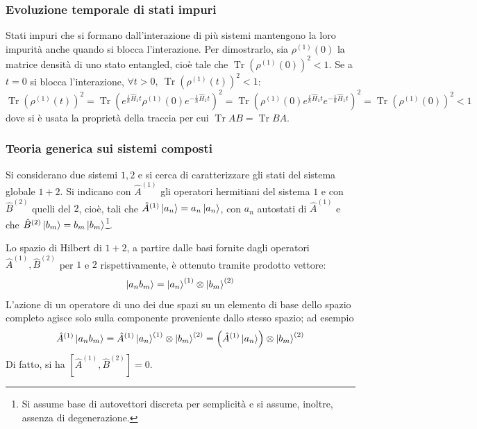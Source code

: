 \documentclass[11pt, a4paper]{scrartcl} %
\numberwithin{equation}{subsection}
\theoremstyle{style2}
\theoremstyle{style1}
\begin{document}
\subsubsection{Evoluzione temporale di stati impuri}

Stati impuri che si formano dall'interazione di pi\`u sistemi mantengono la loro impurit\`a anche quando si blocca l'interazione. 
Per dimostrarlo, sia $\rho ^{(1)} (0)$ la matrice densit\`a di uno stato entangled, cio\`e tale che $\operatorname{Tr} \left(\rho ^{(1)}(0) \right) ^2 < 1 $.
Se a $t=0$ si blocca l'interazione, $\forall t> 0 , \ \operatorname{Tr} \left(\rho ^{(1)} (t)\right) ^2 < 1$:
\[
\operatorname{Tr} \left(\rho ^{(1)} (t)\right) ^2 = \operatorname{Tr} \left(e^{\frac{i}{\hbar }\hat{H}_1 t} \rho ^{(1)} (0) e^{-\frac{i}{\hbar }\hat{H}_1 t} \right) ^2 = \operatorname{Tr} \left(\rho ^{(1)}(0)  e^{\frac{i}{\hbar }\hat{H}_1 t} e^{-\frac{i}{\hbar }\hat{H}_1 t}  \right) ^2 = \operatorname{Tr} \left(\rho ^{(1)} (0)\right) ^2 < 1
\] 
dove si \`e usata la propriet\`a della traccia per cui $\operatorname{Tr} AB = \operatorname{Tr} BA$.

\subsubsection{Teoria generica sui sistemi composti}

Si considerano due sistemi $1,2$ e si cerca di caratterizzare gli stati del sistema globale $1+2$.
Si indicano con $\hat{A}^{(1)} $ gli operatori hermitiani del sistema $1$ e con $\hat{B}^{(2)} $ quelli del $2$, cio\`e, tali che $\hat{A}^{(1)} \ket{a_n} = a_n \ket{a_n} $, con $a_n$ autostati di $\hat{A}^{(1)} $ e che $\hat{B}^{(2)} \ket{b_m} = b_m \ket{b_m} $\footnote{Si assume base di autovettori discreta per semplicit\`a e si assume, inoltre, assenza di degenerazione.}.

Lo spazio di Hilbert di $1+2$, a partire dalle basi fornite dagli operatori $\hat{A}^{(1)} , \hat{B}^{(2)} $ per $1 $ e $2$ rispettivamente, \`e ottenuto tramite prodotto vettore:
\begin{equation}
	\ket{a_n b_m} = \ket{a_n}^{(1)}  \otimes \ket{b_m}^{(2)}  
\end{equation}
L'azione di un operatore di uno dei due spazi su un elemento di base dello spazio completo agisce solo sulla componente proveniente dallo stesso spazio; ad esempio
\[
\hat{A}^{(1)} \ket{a_n b_m} = \hat{A}^{(1)} \ket{a_n} ^{(1)} \otimes \ket{b_m} ^{(2)} = \left(\hat{A}^{(1)} \ket{a_n} \right) \otimes \ket{b_m} ^{(2)} 
\] 
Di fatto, si ha $\left[ \hat{A}^{(1)} , \hat{B}^{(2)}  \right] = 0$.
\end{document}
